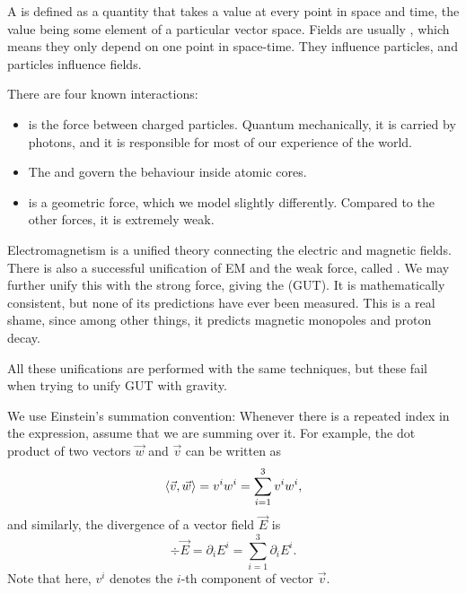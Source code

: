 

A  is defined as a quantity that takes a value at every point in
space and time, the value being some element of a particular vector space.
Fields are usually , which means they only depend on one point in
space-time.
They influence particles, and particles influence fields.

There are four known interactions:
\begin{itemize}
\item {} is the force between charged particles.
  Quantum mechanically, it is carried by photons, and it is responsible for most
  of our experience of the world.
\item The  and  govern the behaviour
  inside atomic cores.
\item {} is a geometric force, which we model slightly differently.
  Compared to the other forces, it is extremely weak.
\end{itemize}

Electromagnetism is a unified theory connecting the electric and magnetic
fields.
There is also a successful unification of EM and the weak force, called
.
We may further unify this with the strong force, giving the  (GUT).
It is mathematically consistent, but none of its predictions have ever been
measured.
This is a real shame, since among other things, it predicts magnetic monopoles
and proton decay.

All these unifications are performed with the same techniques, but these fail
when trying to unify GUT with gravity.


We use Einstein's summation convention:
Whenever there is a repeated index in the expression, assume that we are summing
over it.
For example, the dot product of two vectors $\vec{w}$ and $\vec{v}$ can be
written as
\[
  \left< \vec{v}, \vec{w} \right> = v^i w^i = \sum_{i=1}^3 v^i w^i,
\]
and similarly, the divergence of a vector field $\vec{E}$ is
\[
  \div \vec{E} = \partial_i E^i = \sum_{i=1}^3 \partial_i E^i.
\]
Note that here, $v^i$ denotes the $i$-th component of vector $\vec{v}$.

